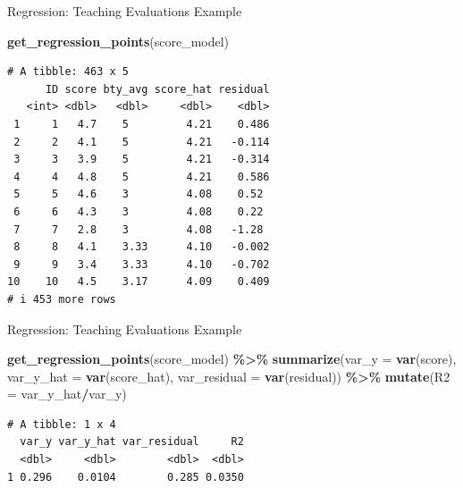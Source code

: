 \documentclass[
  ignorenonframetext,
]{beamer}
\newenvironment{Shaded}{\begin{snugshade}}{\end{snugshade}}
\newcommand{\AttributeTok}[1]{\textcolor[rgb]{0.13,0.29,0.53}{#1}}
\newcommand{\FunctionTok}[1]{\textcolor[rgb]{0.13,0.29,0.53}{\textbf{#1}}}
\newcommand{\NormalTok}[1]{#1}
\newcommand{\SpecialCharTok}[1]{\textcolor[rgb]{0.81,0.36,0.00}{\textbf{#1}}}
\begin{document}
\begin{frame}[fragile]{Regression: Teaching Evaluations Example}
\protect\hypertarget{regression-teaching-evaluations-example-15}{}
\normalsize

\begin{Shaded}
\begin{Highlighting}[]
\FunctionTok{get\_regression\_points}\NormalTok{(score\_model) }
\end{Highlighting}
\end{Shaded}

\begin{verbatim}
# A tibble: 463 x 5
      ID score bty_avg score_hat residual
   <int> <dbl>   <dbl>     <dbl>    <dbl>
 1     1   4.7    5         4.21    0.486
 2     2   4.1    5         4.21   -0.114
 3     3   3.9    5         4.21   -0.314
 4     4   4.8    5         4.21    0.586
 5     5   4.6    3         4.08    0.52 
 6     6   4.3    3         4.08    0.22 
 7     7   2.8    3         4.08   -1.28 
 8     8   4.1    3.33      4.10   -0.002
 9     9   3.4    3.33      4.10   -0.702
10    10   4.5    3.17      4.09    0.409
# i 453 more rows
\end{verbatim}
\end{frame}

\begin{frame}[fragile]{Regression: Teaching Evaluations Example}
\protect\hypertarget{regression-teaching-evaluations-example-16}{}
\small

\begin{Shaded}
\begin{Highlighting}[]
\FunctionTok{get\_regression\_points}\NormalTok{(score\_model) }\SpecialCharTok{\%\textgreater{}\%} 
  \FunctionTok{summarize}\NormalTok{(}\AttributeTok{var\_y =} \FunctionTok{var}\NormalTok{(score), }
            \AttributeTok{var\_y\_hat =} \FunctionTok{var}\NormalTok{(score\_hat), }
            \AttributeTok{var\_residual =} \FunctionTok{var}\NormalTok{(residual)) }\SpecialCharTok{\%\textgreater{}\%} 
  \FunctionTok{mutate}\NormalTok{(}\AttributeTok{R2 =}\NormalTok{ var\_y\_hat}\SpecialCharTok{/}\NormalTok{var\_y)}
\end{Highlighting}
\end{Shaded}

\begin{verbatim}
# A tibble: 1 x 4
  var_y var_y_hat var_residual     R2
  <dbl>     <dbl>        <dbl>  <dbl>
1 0.296    0.0104        0.285 0.0350
\end{verbatim}
\end{frame}
\end{document}
